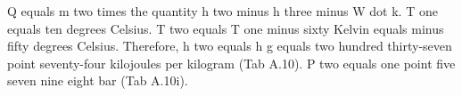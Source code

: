 Q equals m two times the quantity h two minus h three minus W dot k. T one equals ten degrees Celsius. T two equals T one minus sixty Kelvin equals minus fifty degrees Celsius. Therefore, h two equals h g equals two hundred thirty-seven point seventy-four kilojoules per kilogram (Tab A.10). P two equals one point five seven nine eight bar (Tab A.10i).